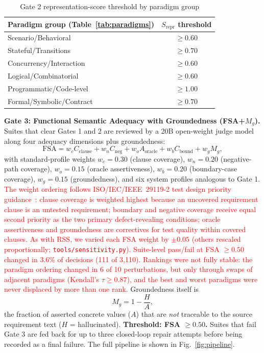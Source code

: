 \documentclass[conference]{IEEEtran}
\begin{document}
  \begin{table}[t]
  \centering
  \caption{Gate 2 representation-score threshold by paradigm group}
  \label{tab:sfvthresh}
  \small
  \begin{tabular}{@{}lc@{}}
  \toprule
  \textbf{Paradigm group (Table~\ref{tab:paradigms})} & \textbf{$S_{\text{repr}}$ threshold} \\
  \midrule
  Scenario/Behavioral & $\geq 0.60$ \\
  Stateful/Transitions & $\geq 0.70$ \\
  Concurrency/Interaction & $\geq 0.60$ \\
  Logical/Combinatorial & $\geq 0.60$ \\
  Programmatic/Code-level & $\geq 1.00$ \\
  Formal/Symbolic/Contract & $\geq 0.70$ \\
  \bottomrule
  \end{tabular}
  \end{table}

  \textbf{Gate 3: Functional Semantic Adequacy with Groundedness (FSA+$M_g$).}
  Suites that clear Gates 1 and 2 are reviewed by a 20B open-weight judge model along four
  adequacy dimensions plus groundedness:
  \begin{equation}
  \mathrm{FSA} = w_c C_{\text{clause}} + w_n C_{\text{neg}} + w_o A_{\text{oracle}} + w_b C_{\text{bound}} + w_g M_g,
  \end{equation}
  with standard-profile weights $w_c=0.30$ (clause coverage), $w_n=0.20$
  (negative-path coverage), $w_o=0.15$ (oracle assertiveness), $w_b=0.20$
  (boundary-case coverage), $w_g=0.15$ (groundedness), and six system profiles
  analogous to Gate 1.  \textcolor{red}{ The weight ordering follows ISO/IEC/IEEE~29119-2
  test design priority guidance~\cite{iso29119}: clause coverage is weighted
  highest because an uncovered requirement clause is an untested requirement;
  boundary and negative coverage receive equal second priority as the two
  primary defect-revealing conditions; oracle assertiveness and groundedness
  are correctives for test quality within covered clauses. As with RSS, we varied each FSA weight by
  $\pm0.05$ (others rescaled proportionally; \texttt{tools/sensitivity.py}).
  Suite-level pass/fail at FSA $\geq 0.50$ changed in 3.6\% of decisions
  (111 of 3{,}110). Rankings were not fully stable: the paradigm ordering changed
  in 6 of 10 perturbations, but only through swaps of adjacent paradigms
  (Kendall's $\tau\geq0.87$), and the best and worst paradigms were never displaced
  by more than one rank.} Groundedness itself is
  \begin{equation}
  M_g = 1 - \frac{H}{A},
  \end{equation}
  the fraction of asserted concrete values ($A$) that are \emph{not} traceable
  to the source requirement text ($H$ = hallucinated). \textbf{Threshold: FSA
  $\geq 0.50$.} Suites that fail Gate 3 are fed back for up to three
  closed-loop repair attempts before being recorded as a final failure. The
  full pipeline is shown in Fig.~\ref{fig:pipeline}.
\end{document}
